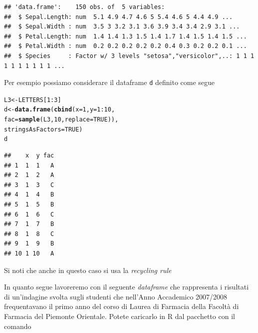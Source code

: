 \documentclass[onecolumn,12pt]{book}\usepackage[]{graphicx}\usepackage[]{color}
\makeatletter
\newcommand{\hlnum}[1]{\textcolor[rgb]{0.686,0.059,0.569}{#1}}%
\newcommand{\hlopt}[1]{\textcolor[rgb]{0,0,0}{#1}}%
\newcommand{\hlstd}[1]{\textcolor[rgb]{0.345,0.345,0.345}{#1}}%
\newcommand{\hlkwb}[1]{\textcolor[rgb]{0.69,0.353,0.396}{#1}}%
\newcommand{\hlkwc}[1]{\textcolor[rgb]{0.333,0.667,0.333}{#1}}%
\newcommand{\hlkwd}[1]{\textcolor[rgb]{0.737,0.353,0.396}{\textbf{#1}}}%
\newenvironment{kframe}{%
 \def\at@end@of@kframe{}%
 \ifinner\ifhmode%
  \def\at@end@of@kframe{\end{minipage}}%
  \begin{minipage}{\columnwidth}%
 \fi\fi%
 \def\FrameCommand##1{\hskip\@totalleftmargin \hskip-\fboxsep
 \colorbox{shadecolor}{##1}\hskip-\fboxsep
     \hskip-\linewidth \hskip-\@totalleftmargin \hskip\columnwidth}%
 \MakeFramed {\advance\hsize-\width
   \@totalleftmargin\z@ \linewidth\hsize
   \@setminipage}}%
 {\par\unskip\endMakeFramed%
 \at@end@of@kframe}
\newenvironment{knitrout}{}{} %
\makeatother
\begin{document}
\small
\begin{knitrout}
\color{fgcolor}\begin{kframe}
\begin{verbatim}
## 'data.frame':	150 obs. of  5 variables:
##  $ Sepal.Length: num  5.1 4.9 4.7 4.6 5 5.4 4.6 5 4.4 4.9 ...
##  $ Sepal.Width : num  3.5 3 3.2 3.1 3.6 3.9 3.4 3.4 2.9 3.1 ...
##  $ Petal.Length: num  1.4 1.4 1.3 1.5 1.4 1.7 1.4 1.5 1.4 1.5 ...
##  $ Petal.Width : num  0.2 0.2 0.2 0.2 0.2 0.4 0.3 0.2 0.2 0.1 ...
##  $ Species     : Factor w/ 3 levels "setosa","versicolor",..: 1 1 1 1 1 1 1 1 1 1 ...
\end{verbatim}
\end{kframe}
\end{knitrout}
\normalsize
Per esempio possiamo considerare il dataframe \texttt{d} definito come segue 
\begin{knitrout}
\color{fgcolor}\begin{kframe}
\begin{alltt}
\hlstd{L3} \hlkwb{<-} \hlstd{LETTERS[}\hlnum{1}\hlopt{:}\hlnum{3}\hlstd{]}
\hlstd{d} \hlkwb{<-} \hlkwd{data.frame}\hlstd{(}\hlkwd{cbind}\hlstd{(}\hlkwc{x}\hlstd{=}\hlnum{1}\hlstd{,} \hlkwc{y}\hlstd{=}\hlnum{1}\hlopt{:}\hlnum{10}\hlstd{,}
\hlkwc{fac}\hlstd{=}\hlkwd{sample}\hlstd{(L3,} \hlnum{10}\hlstd{,} \hlkwc{replace}\hlstd{=}\hlnum{TRUE}\hlstd{)),}
\hlkwc{stringsAsFactors}\hlstd{=}\hlnum{TRUE}\hlstd{)}
\hlstd{d}
\end{alltt}
\begin{verbatim}
##    x  y fac
## 1  1  1   A
## 2  1  2   A
## 3  1  3   C
## 4  1  4   B
## 5  1  5   B
## 6  1  6   C
## 7  1  7   B
## 8  1  8   C
## 9  1  9   B
## 10 1 10   A
\end{verbatim}
\end{kframe}
\end{knitrout}
Si noti che anche in questo caso si usa la \emph{recycling rule}

In quanto segue lavoreremo con il seguente \emph{dataframe} che rappresenta i risultati di un'indagine svolta sugli studenti che nell'Anno Accademico 2007/2008 frequentavano il primo anno del corso di Laurea di Farmacia della Facolt\`a di Farmacia del Piemonte Orientale. Potete caricarlo  in {\textsf R} dal pacchetto con il comando
\end{document}
